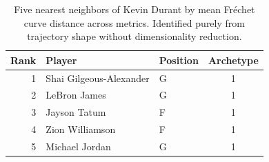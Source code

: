 \begin{table}[htbp]
  \centering\small
  \begin{tabular}{rllc}
    \toprule
    Rank & Player & Position & Archetype \\
    \midrule
    1 & Shai Gilgeous-Alexander & G & 1 \\
    2 & LeBron James & G & 1 \\
    3 & Jayson Tatum & F & 1 \\
    4 & Zion Williamson & F & 1 \\
    5 & Michael Jordan & G & 1 \\
    \bottomrule
  \end{tabular}
  \caption{Five nearest neighbors of Kevin Durant by mean Fr\'{e}chet curve distance across metrics. Identified purely from trajectory shape without dimensionality reduction.}
  \label{tab:Kevin_Durant_frechet_curve_neighbors}
\end{table}

